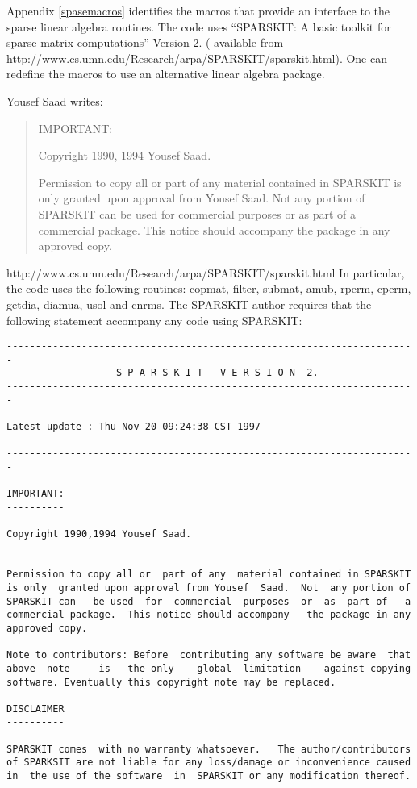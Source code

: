 \documentclass{article}
\begin{document}
\label{sec:sparskit}
Appendix \ref{spasemacros} identifies the macros that provide an interface
to the sparse linear algebra routines. 
The code uses ``SPARSKIT: A basic toolkit for sparse matrix computations'' Version 2. ( available from http://www.cs.umn.edu/Research/arpa/SPARSKIT/sparskit.html). One can redefine the macros to use an alternative linear algebra
package.

Yousef Saad writes:
\begin{quote}
  IMPORTANT: 


Copyright 1990, 1994 Yousef Saad.

Permission to copy all or  part of any  material contained in SPARSKIT
is only  granted upon approval from Yousef  Saad.  Not  any portion of
SPARSKIT can   be used  for  commercial  purposes  or  as  part of   a
commercial package.  This notice should accompany   the package in any
approved copy.



\end{quote}




 http://www.cs.umn.edu/Research/arpa/SPARSKIT/sparskit.html
In particular, the code uses the following routines:
copmat, filter, submat, amub, rperm, cperm, getdia, diamua, usol and cnrms.
The SPARSKIT author requires that the 
following statement accompany any code using SPARSKIT:

\begin{verbatim}
-----------------------------------------------------------------------
                   S P A R S K I T   V E R S I O N  2.
----------------------------------------------------------------------- 

Latest update : Thu Nov 20 09:24:38 CST 1997

-----------------------------------------------------------------------

IMPORTANT: 
---------- 

Copyright 1990,1994 Yousef Saad.
------------------------------------ 

Permission to copy all or  part of any  material contained in SPARSKIT
is only  granted upon approval from Yousef  Saad.  Not  any portion of
SPARSKIT can   be used  for  commercial  purposes  or  as  part of   a
commercial package.  This notice should accompany   the package in any
approved copy.

Note to contributors: Before  contributing any software be aware  that
above  note     is   the only    global  limitation    against copying
software. Eventually this copyright note may be replaced.

DISCLAIMER
----------

SPARSKIT comes  with no warranty whatsoever.   The author/contributors
of SPARKSIT are not liable for any loss/damage or inconvenience caused
in  the use of the software  in  SPARSKIT or any modification thereof.


\end{verbatim}
\end{document}
